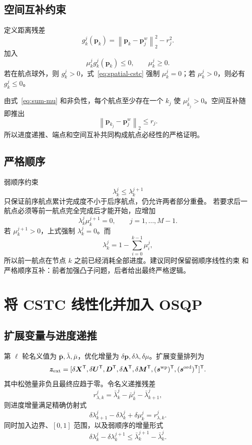 \documentclass[UTF8,a4paper,11pt]{ctexart}
\newcommand{\nTwo}[1]{\left\lVert#1\right\rVert_2}
\begin{document}
\subsection{空间互补约束}

定义距离残差
\[
 g_k^j(\bm p_k)=\nTwo{\bm p_k-\bm p_j^w}^2-r_j^2.
\]
加入
\begin{equation}
 \mu_k^j g_k^j(\bm p_k)\leq0,\qquad\mu_k^j\geq0.
 \label{eq:spatial-cstc}
\end{equation}
若在航点球外，则 $g_k^j>0$，式~\eqref{eq:spatial-cstc} 强制
$\mu_k^j=0$；若 $\mu_k^j>0$，则必有 $g_k^j\leq0$。

由式~\eqref{eq:sum-mu} 和非负性，每个航点至少存在一个 $k_j$ 使
$\mu_{k_j}^j>0$。空间互补随即推出
\[
 \nTwo{\bm p_{k_j}-\bm p_j^w}\leq r_j.
\]
所以进度递推、端点和空间互补共同构成航点必经性的严格证明。

\subsection{严格顺序}

弱顺序约束
\[
 \lambda_k^j\leq\lambda_k^{j+1}
 \label{eq:weak-order}
\]
只保证前序航点累计完成度不小于后序航点，仍允许两者部分重叠。
若要求后一航点必须等前一航点完全完成后才能开始，应增加
\begin{equation}
 \lambda_k^j\mu_k^{j+1}=0,\qquad j=1,\ldots,M-1.
 \label{eq:strict-order}
\end{equation}
若 $\mu_k^{j+1}>0$，上式强制 $\lambda_k^j=0$。而
\[
 \lambda_k^j=1-\sum_{i=0}^{k-1}\mu_i^j,
\]
所以前一航点在节点 $k$ 之前已经消耗全部进度。建议同时保留弱顺序线性约束
和严格顺序互补：前者加强凸子问题，后者给出最终严格逻辑。

\section{将 CSTC 线性化并加入 OSQP}

\subsection{扩展变量与进度递推}

第 $\ell$ 轮名义值为 $\bar{\bm p},\bar\lambda,\bar\mu$，优化增量为
$\delta\bm p,\delta\lambda,\delta\mu$。扩展变量排列为
\[
 \bm z_{\rm ext}=[
 \delta\bm X^\mathsf T,\delta\bm U^\mathsf T,\bm D^\mathsf T,
 \delta\bm\Lambda^\mathsf T,\delta\bm M^\mathsf T,
 (\bm s^{\rm wp})^\mathsf T,(\bm s^{\rm ord})^\mathsf T]^\mathsf T.
\]
其中松弛量非负且最终应趋于零。令名义递推残差
\[
 r_{\lambda,k}^j=\bar\lambda_k^j-\bar\mu_k^j-\bar\lambda_{k+1}^j,
\]
则进度增量满足精确仿射式
\begin{equation}
 \delta\lambda_{k+1}^j-\delta\lambda_k^j+\delta\mu_k^j
 =r_{\lambda,k}^j.
 \label{eq:linear-progress}
\end{equation}
同时加入边界、$[0,1]$ 范围，以及弱顺序的增量形式
\[
 \delta\lambda_k^j-\delta\lambda_k^{j+1}
 \leq\bar\lambda_k^{j+1}-\bar\lambda_k^j.
\]
\end{document}
